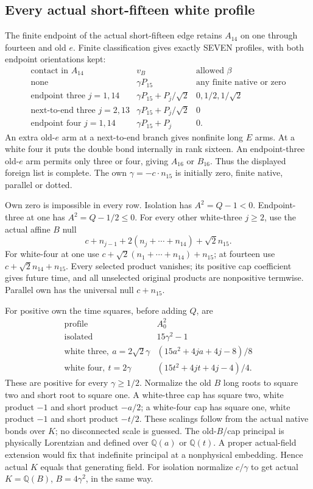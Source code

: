 \documentclass[11pt]{article}
\begin{document}
\subsection{Every actual short-fifteen white profile}
\label{app:arithB15Ishort}

The finite endpoint of the actual short-fifteen edge
retains \(A_{14}\) on one through fourteen and old \(e\).
Finite classification gives exactly SEVEN profiles,
with both endpoint orientations kept:
\[
\begin{array}{c|c|c}
 \text{contact in }A_{14}&v_B&\text{allowed }\beta\\ \hline
 \text{none}&\gamma P_{15}&\text{any finite native or zero}\\
 \text{endpoint three }j=1,14&
       \gamma P_{15}+P_j/\sqrt2&0,1/2,1/\sqrt2\\
 \text{next-to-end three }j=2,13&
       \gamma P_{15}+P_j/\sqrt2&0\\
 \text{endpoint four }j=1,14&
       \gamma P_{15}+P_j&0 .
\end{array}
\]
An extra old-\(e\) arm at a next-to-end branch gives
nonfinite long \(E\) arms.
At a white four it puts the double bond internally
in rank sixteen.
An endpoint-three old-\(e\) arm permits only three
or four, giving \(A_{16}\) or \(B_{16}\).
Thus the displayed foreign list is complete.
The own \(\gamma=-c\cdot n_{15}\) is initially zero,
finite native, parallel or dotted.

Own zero is impossible in every row.
Isolation has \(A^2=Q-1<0\).
Endpoint-three at one has \(A^2=Q-1/2\le0\).
For every other white-three \(j\ge2\), use the actual
affine \(B\) null
\[
              c+n_{j-1}+2(n_j+\cdots+n_{14})+\sqrt2n_{15}.
\]
For white-four at one use
\(c+\sqrt2(n_1+\cdots+n_{14})+n_{15}\);
at fourteen use \(c+\sqrt2n_{14}+n_{15}\).
Every selected product vanishes; its positive cap
coefficient gives future time, and all unselected
original products are nonpositive termwise.
Parallel own has the universal null \(c+n_{15}\).

For positive own the time squares, before adding \(Q\), are
\[
\begin{array}{c|c}
 \text{profile}&A_0^2\\ \hline
 \text{isolated}&15\gamma^2-1\\
 \text{white three},\ a=2\sqrt2\gamma&
               (15a^2+4ja+4j-8)/8\\
 \text{white four},\ t=2\gamma&
               (15t^2+4jt+4j-4)/4 .
\end{array}
\]
These are positive for every \(\gamma\ge1/2\).
Normalize the old \(B\) long roots to square two and
short root to square one.
A white-three cap has square two, white product \(-1\)
and short product \(-a/2\);
a white-four cap has square one, white product \(-1\)
and short product \(-t/2\).
These scalings follow from the actual native bonds over
\(K\); no disconnected scale is guessed.
The old-\(B\)/cap principal is physically Lorentzian
and defined over \(\mathbb Q(a)\) or \(\mathbb Q(t)\).
A proper actual-field extension would fix that
indefinite principal at a nonphysical embedding.
Hence actual \(K\) equals that generating field.
For isolation normalize \(c/\gamma\) to get
actual \(K=\mathbb Q(B)\), \(B=4\gamma^2\), in the same way.
\end{document}

